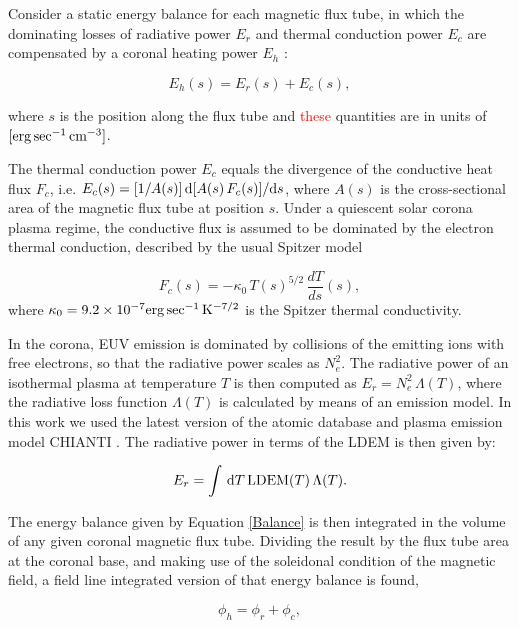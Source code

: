 \documentclass[namedreferences]{solarphysics}
\def\edit#1{\textcolor{Red}{#1}}
\newcommand{\LDEM}{{\rm LDEM}}
\begin{document}
\begin{article}
{Consider} a static energy balance for each magnetic flux tube, {in which the dominating losses of} radiative power $E_r$ and thermal conduction power $E_c$ are compensated {by a} coronal heating power $E_h$ \citep{aschwanden_2004}:

\begin{equation}\label{Balance}
E_h(s) = E_r(s) + E_c(s),
\end{equation}

\noindent
where $s$ is the position along {the flux tube} and \edit{these} quantities are in units of $[{\rm erg\,sec^{-1}\,cm^{-3}}]$.

{The thermal conduction power $E_c$ equals the divergence of the conductive heat flux $F_c$, {i.e.} $E_c(s)=[1/A(s)]\,{\rm d}[A(s)\,F_c(s)]/{\rm d}s$, where $A(s)$ is the {cross-sectional} area of the magnetic flux tube at position $s$. Under a quiescent solar corona plasma regime, the conductive flux is assumed to be dominated by the electron thermal conduction, described by the usual Spitzer model \citep{spitzer_1962}

\begin{equation}\label{Fc}
F_c(s)=-\kappa_0\,{T(s)}^{5/2}\,\frac{dT}{ds}(s),
\end{equation}
where $\kappa_0 = 9.2 \times 10^{-7}  {\rm erg\,sec^{-1}\,K^{-7/2}}$ is the Spitzer thermal conductivity.}

{In the corona, EUV emission is dominated by collisions of the emitting ions with free electrons, so that the radiative power scales as $N_e^2$. The radiative power of an isothermal plasma at temperature $T$ is then computed as $E_r=N_e^2\,\Lambda(T)$, where the radiative loss function $\Lambda(T)$ is calculated by means of an emission model. In this work we used the latest version of the atomic database and plasma emission model CHIANTI \citep{delzanna_2015}. The radiative power in terms of the LDEM is then given by:}

\begin{equation}\label{Er}
E_r = \int\,\textrm{d}T\,\LDEM(T)\,\Lambda(T).
\end{equation}

{The energy balance given by Equation \ref{Balance} is then integrated in the volume of any given coronal magnetic flux tube. Dividing the result by the flux tube area at the coronal base, and making use of the soleidonal condition of the magnetic field, a {field line integrated} version of that energy balance is found,

\begin{equation}\label{FluxBalance}
\phi_h = \phi_r + \phi_c,
\end{equation}

}
\end{article}
\end{document}
